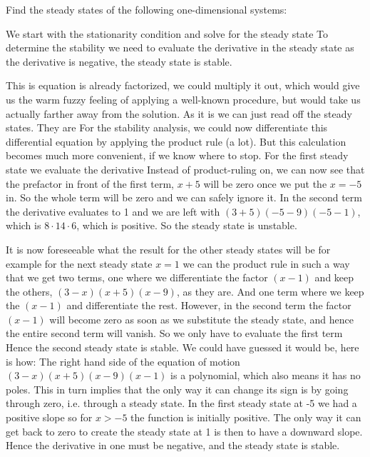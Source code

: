 
Find the steady states of the following one-dimensional systems:
\subquestion
{}

\solution
We start with the stationarity condition 
and solve for the steady state 
To determine the stability we need to evaluate the derivative in the steady state
as the derivative is negative, the steady state is stable. 

\subquestion
{}

\solution
This is equation is already factorized, we could multiply it out, which would give us the warm fuzzy feeling of applying a well-known procedure, but would take us actually farther away from the solution. As it is we can just read off the steady states. They are 
For the stability analysis, we could now differentiate this differential equation by applying the product rule (a lot). But this calculation becomes much more convenient, if we know where to stop. For the first steady state we evaluate the derivative 
Instead of product-ruling on, we can now see that the prefactor in front of the first term, $x+5$ will be zero once we put the $x=-5$ in. So the whole term will be zero and we can safely ignore it. In the second term the derivative evaluates to 1 and we are left with $(3+5)(-5-9)(-5-1)$, which is $8\cdot 14 \cdot 6$, which is positive. So the steady state is unstable.

It is now foreseeable what the result for the other steady states will be for example for the next steady state $x=1$ we can the product rule in such a way that we get two terms, one where we differentiate the factor $(x-1)$ and keep the others, $(3-x)(x+5)(x-9)$, as they are. And one term where we keep the $(x-1)$ and differentiate the rest. However, in the second term the factor $(x-1)$ will become zero as soon as we substitute the steady state, and hence the entire second term will vanish. So we only have to evaluate the first term 
Hence the second steady state is stable. We could have guessed it would be, here is how: The right hand side of the equation of motion $(3-x)(x+5)(x-9)(x-1)$ is a polynomial, which also means it has no poles. This in turn implies that the only way it can change its sign is by going through zero, i.e. through a steady state. In the first steady state at -5 we had a positive slope so for $x>-5$ the function is initially positive. The only way it can get back to zero to create the steady state at 1 is then to have a downward slope. Hence the derivative in one must be negative, and the steady state is stable. 

